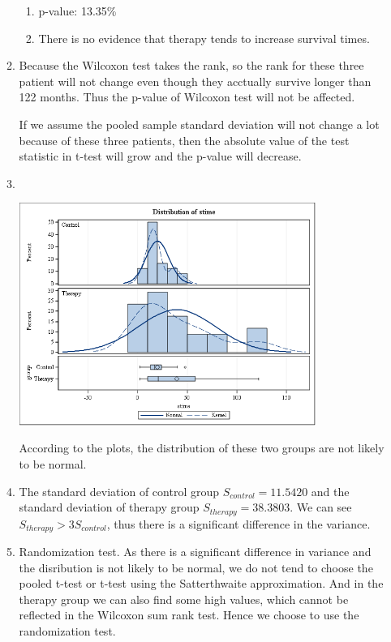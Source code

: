 \documentclass{article}
\begin{document}
\begin{enumerate}[leftmargin = 0 em, label = \arabic*., font = \bfseries]
\begin{enumerate}
\begin{enumerate}[label = (\roman*)]
	\item p-value: 13.35\%

	\item There is no evidence that therapy tends to increase survival times.
\end{enumerate}
\item
Because the Wilcoxon test takes the rank, so the rank for these three patient will not change even though they acctually survive longer than 122 months. Thus the p-value of Wilcoxon test will not be affected.

If we assume the pooled sample standard deviation will not change a lot because of these three patients, then the absolute value of the test statistic in t-test will grow and the p-value will decrease.

\item \ 
\begin{center}
\includegraphics[width = 0.8\textwidth]{diststimes.png}
\end{center}
According to the plots, the distribution of these two groups are not likely to be normal. 

\item The standard deviation of control group $S_{control} = 11.5420$ and the standard deviation of therapy group $S_{therapy} = 38.3803$. We can see $S_{therapy} > 3 S_{control}$, thus there is a significant difference in the variance.

\item
Randomization test. As there is a significant difference in variance and the disribution is not likely to be normal, we do not tend to choose the pooled t-test or t-test using the Satterthwaite approximation. And in the therapy group we can also find some high values, which cannot be reflected in the Wilcoxon sum rank test. Hence we choose to use the randomization test.
\end{enumerate}

	
	\end{enumerate}
	
	
\end{document}
